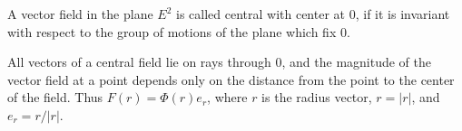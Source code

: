 A vector field in the plane $E^2$ is called central with center at $0$, if it is invariant with respect to the group of motions of the plane which fix $0$.

All vectors of a central field lie on rays through $0$, and the magnitude of the vector field at a point depends only on the distance from the point to the center of the field. Thus $F(r) = \Phi(r) e_r$, where $r$ is the radius vector, $r = |r|$, and $e_r = r/|r|$.

